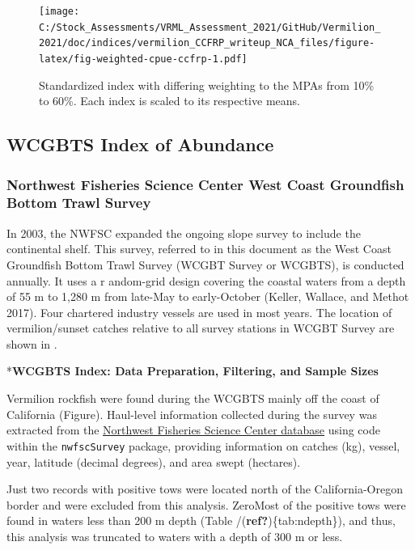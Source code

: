 \documentclass[
  english,
  a4paper,
]{article}
\begin{document}
\begin{figure}
\centering
\texttt{[image: C:/Stock\_Assessments/VRML\_Assessment\_2021/GitHub/Vermilion\_2021/doc/indices/vermilion\_CCFRP\_writeup\_NCA\_files/figure-latex/fig-weighted-cpue-ccfrp-1.pdf]}
\caption{\label{fig:fig-weighted-cpue-ccfrp}Standardized index with differing weighting to the MPAs from 10\% to 60\%. Each index is scaled to its respective means.}
\end{figure}

\clearpage

\hypertarget{wcgbts-index}{%
\subsection{WCGBTS Index of Abundance}\label{wcgbts-index}}

\hypertarget{northwest-fisheries-science-center-west-coast-groundfish-bottom-trawl-survey}{%
\subsubsection{Northwest Fisheries Science Center West Coast Groundfish Bottom Trawl Survey}\label{northwest-fisheries-science-center-west-coast-groundfish-bottom-trawl-survey}}

In 2003, the NWFSC expanded the ongoing slope survey to include the continental
shelf. This survey, referred to in this document as the West Coast Groundfish
Bottom Trawl Survey (WCGBT Survey or WCGBTS), is conducted annually. It uses a r
andom-grid design covering the coastal waters from a depth of 55 m to 1,280 m
from late-May to early-October (Keller, Wallace, and Methot 2017). Four chartered industry vessels
are used in most years. The location of vermilion/sunset catches relative to all
survey stations in WCGBT Survey are shown in .

*\textbf{WCGBTS Index: Data Preparation, Filtering, and Sample Sizes}

Vermilion rockfish were found during the WCGBTS mainly off the coast of
California (Figure). Haul-level information collected during the
survey was extracted from the
\href{https://www.webapps.nwfsc.noaa.gov/data}{Northwest Fisheries Science Center database}
using code within the \texttt{nwfscSurvey} package, providing information on
catches (kg),
vessel,
year,
latitude (decimal degrees), and
area swept (hectares).

Just
two
records with positive tows were located north of the California-Oregon border
and were excluded from this analysis.
ZeroMost of the positive tows were found in waters less than 200 m depth
(Table /(\textbf{ref?})\{tab:ndepth\}), and thus,
this analysis was truncated to waters with a depth of 300 m or less.
\end{document}
